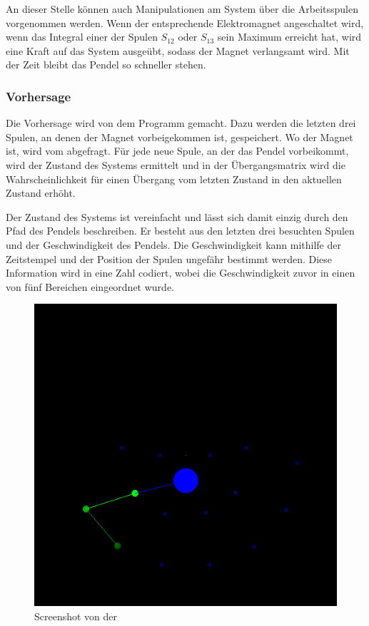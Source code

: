 An dieser Stelle können auch Manipulationen am System über die Arbeitsspulen vorgenommen werden.
Wenn der entsprechende Elektromagnet angeschaltet wird, wenn das Integral einer der Spulen $S_{12}$ oder $S_{13}$ sein Maximum erreicht hat, wird eine Kraft auf das System ausgeübt, sodass der Magnet verlangsamt wird.
Mit der Zeit bleibt das Pendel so schneller stehen.

\subsubsection{Vorhersage}
Die Vorhersage wird von dem Programm  gemacht.
Dazu werden die letzten drei Spulen, an denen der Magnet vorbeigekommen ist, gespeichert.
Wo der Magnet ist, wird vom  abgefragt.
Für jede neue Spule, an der das Pendel vorbeikommt, wird der Zustand des Systems ermittelt und in der Übergangsmatrix wird die Wahrscheinlichkeit für einen Übergang vom letzten Zustand in den aktuellen Zustand erhöht.

Der Zustand des Systems ist vereinfacht und lässt sich damit einzig durch den Pfad des Pendels beschreiben.
Er besteht aus den letzten drei besuchten Spulen und der Geschwindigkeit des Pendels.
Die Geschwindigkeit kann mithilfe der Zeitstempel und der Position der Spulen ungefähr bestimmt werden.
Diese Information wird in eine Zahl codiert, wobei die Geschwindigkeit zuvor in einen von fünf Bereichen eingeordnet wurde.

\begin{figure}[hbt]
  \centering
  \includegraphics[width=\textwidth]{images/prediction.png}
  \caption{Screenshot von der }
  \label{fig:screenmarkov}
\end{figure}

